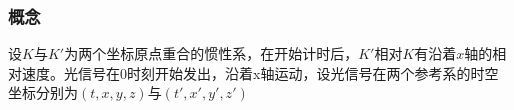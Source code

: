 \subsubsection{概念}
设$K$与$K'$为两个坐标原点重合的惯性系，在开始计时后，$K'$相对$K$有沿着$x$轴的相对速度。光信号在0时刻开始发出，沿着x轴运动，设光信号在两个参考系的时空坐标分别为$(t,x,y,z)$与$(t',x',y',z')$
